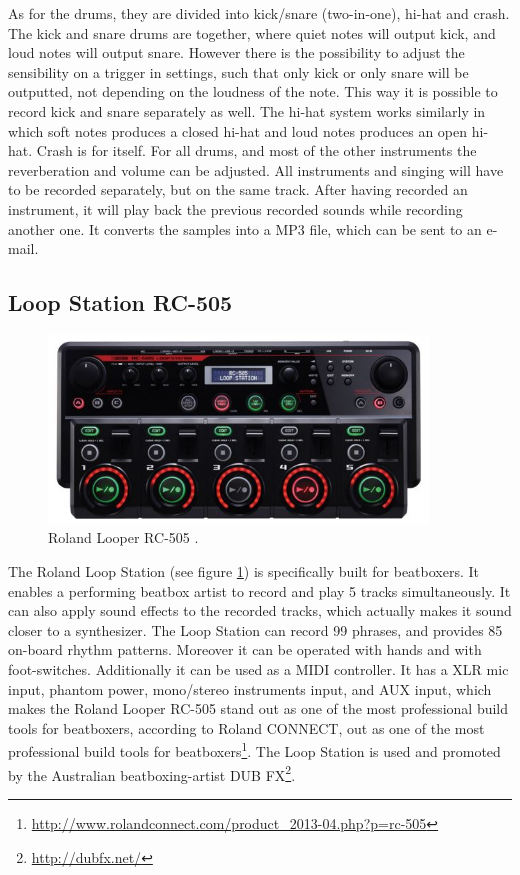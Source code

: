 As for the drums, they are divided into kick/snare (two-in-one), hi-hat and crash. The kick and snare drums are together, where quiet notes will output kick, and loud notes will output snare. However there is the possibility to adjust the sensibility on a trigger in settings, such that only kick or only snare will be outputted, not depending on the loudness of the note. This way it is possible to record kick and snare separately as well. The hi-hat system works similarly in which soft notes produces a closed hi-hat and loud notes produces an open hi-hat. Crash is for itself. For all drums, and most of the other instruments the reverberation and volume can be adjusted. 
All instruments and singing will have to be recorded separately, but on the same track. After having recorded an instrument, it will play back the previous recorded sounds while recording another one. It converts the samples into a MP3 file, which can be sent to an e-mail. 

\subsection{ Loop Station RC-505 }
\label{loopstation}
\begin{figure}[h]
	\begin{center}
		\includegraphics[height=5cm]{fig/Roland-RC-505.JPG}
		\caption{Roland Looper RC-505 \citep{ROLAND}.}
		\label{Looper}
	\end{center}
\end{figure}
The Roland Loop Station (see figure \ref{Looper}) is specifically built for beatboxers. It enables a performing beatbox artist to record and play 5 tracks simultaneously. It can also apply sound effects to the recorded tracks, which actually makes it sound closer to a synthesizer. The Loop Station can record 99 phrases, and provides 85 on-board rhythm patterns. Moreover it can be operated with hands and with foot-switches. Additionally it can be used as a MIDI controller. It has a XLR mic input, phantom power, mono/stereo instruments input, and AUX input, which makes the Roland Looper RC-505 stand out as one of the most professional build tools for beatboxers, according to Roland CONNECT, out as one of the most professional build tools for beatboxers\footnote{\url{http://www.rolandconnect.com/product_2013-04.php?p=rc-505}}.
The Loop Station is used and promoted by the Australian beatboxing-artist DUB FX\footnote{\url{http://dubfx.net/}}.